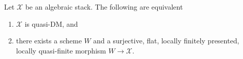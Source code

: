 %
\begin{theorem}
\label{theorem-quasi-DM}
Let $\mathcal{X}$ be an algebraic stack. The following are equivalent
\begin{enumerate}
\item $\mathcal{X}$ is quasi-DM, and
\item there exists a scheme $W$ and a surjective, flat, locally finitely
presented, locally quasi-finite morphism $W \to \mathcal{X}$.
\end{enumerate}
\end{theorem}

